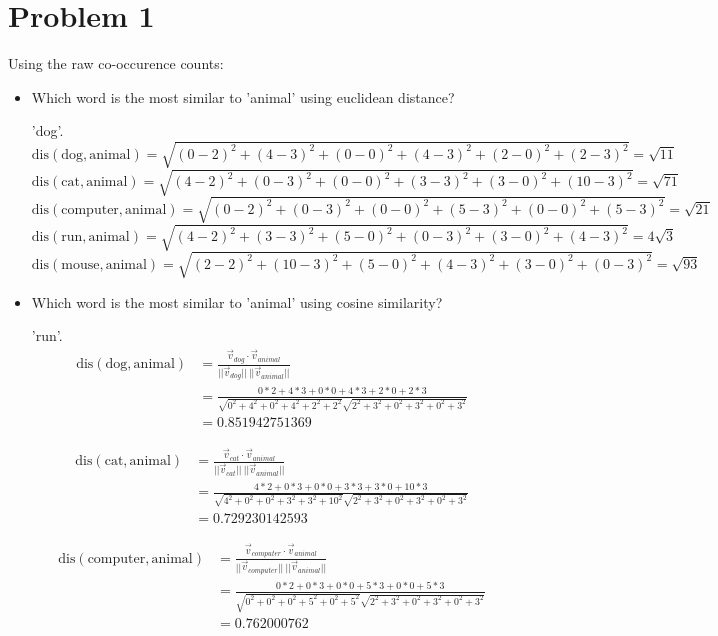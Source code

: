 \documentclass[twoside,11pt]{homework}
\date{\today} %
\begin{document}
\maketitle

\section*{Problem 1}

Using the raw co-occurence counts:
\begin{itemize}
\item Which word is the most similar to 'animal' using euclidean distance?

  'dog'.
  \[
    \text{dis}(\text{dog}, \text{animal})
    = \sqrt{(0-2)^2+(4-3)^2+(0-0)^2+(4-3)^2+(2-0)^2+(2-3)^2}
    = \sqrt{11}
  \]
  \[
    \text{dis}(\text{cat}, \text{animal})
    = \sqrt{(4-2)^2+(0-3)^2+(0-0)^2+(3-3)^2+(3-0)^2+(10-3)^2}
    = \sqrt{71}
  \]
  \[
    \text{dis}(\text{computer}, \text{animal})
    = \sqrt{(0-2)^2+(0-3)^2+(0-0)^2+(5-3)^2+(0-0)^2+(5-3)^2}
    = \sqrt{21}
  \]
  \[
    \text{dis}(\text{run}, \text{animal})
    = \sqrt{(4-2)^2+(3-3)^2+(5-0)^2+(0-3)^2+(3-0)^2+(4-3)^2}
    = 4 \sqrt{3}
  \]
  \[
    \text{dis}(\text{mouse}, \text{animal})
    = \sqrt{(2-2)^2+(10-3)^2+(5-0)^2+(4-3)^2+(3-0)^2+(0-3)^2}
    = \sqrt{93}
  \]
\item Which word is the most similar to 'animal' using cosine similarity?

  'run'.
  \[
  \begin{aligned}
  \text{dis}(\text{dog}, \text{animal})
  &= \frac{\vec{v}_{dog} \cdot \vec{v}_{animal}}{||\vec{v}_{dog}|| \ ||\vec{v}_{animal}||}\\
  &= \frac{0*2 + 4*3 + 0*0 + 4*3 + 2*0 + 2*3}{ \sqrt{0^2+4^2+0^2+4^2+2^2+2^2}
    \sqrt{2^2+3^2+0^2+3^2+0^2+3^2}}\\
  &= 0.851942751369
  \end{aligned}
  \]

  \[
  \begin{aligned}
  \text{dis}(\text{cat}, \text{animal})
  &= \frac{\vec{v}_{cat} \cdot \vec{v}_{animal}}{||\vec{v}_{cat}|| \ ||\vec{v}_{animal}||}\\
  &= \frac{4*2 + 0*3 + 0*0 + 3*3 + 3*0 + 10*3}{ \sqrt{4^2+0^2+0^2+3^2+3^2+10^2}
    \sqrt{2^2+3^2+0^2+3^2+0^2+3^2}}\\
  &= 0.729230142593
  \end{aligned}
  \]

  \[
  \begin{aligned}
  \text{dis}(\text{computer}, \text{animal})
  &= \frac{\vec{v}_{computer} \cdot \vec{v}_{animal}}{||\vec{v}_{computer}|| \ ||\vec{v}_{animal}||}\\
  &= \frac{0*2 + 0*3 + 0*0 + 5*3 + 0*0 + 5*3}{ \sqrt{0^2+0^2+0^2+5^2+0^2+5^2}
    \sqrt{2^2+3^2+0^2+3^2+0^2+3^2}}\\
  &= 0.762000762
  \end{aligned}
  \]


\end{itemize}
\end{document}
